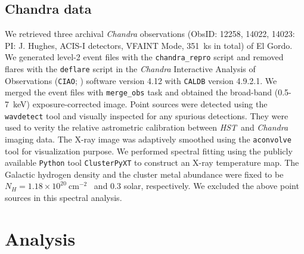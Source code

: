 \documentclass[twocolumn]{aastex631}
\newcommand{\elgordo}{El Gordo}
\newcommand{\HST}{{\it HST}}
\begin{document}
\subsection{Chandra data} \label{Chandra_observations}
We retrieved three archival \emph{Chandra} observations (ObsID: 12258, 14022, 14023: PI: J. Hughes, ACIS-I detectors, VFAINT Mode, 351~ks in total) of \elgordo. 
We generated level-2 event files with the \texttt{chandra\_repro} script and removed flares with the \texttt{deflare} script in the \emph{Chandra} Interactive Analysis of Observations (\texttt{CIAO}; \citealt{CIAO}) software version 4.12 with \texttt{CALDB} version 4.9.2.1. 
We merged the event files with \texttt{merge\_obs} task and obtained the broad-band (0.5-7~keV) exposure-corrected image. 
Point sources were detected using the \texttt{wavdetect} tool and visually inspected for any spurious detections. They were used to verity the relative astrometric calibration between \HST~and \emph{Chandra} imaging data. 
The X-ray image was adaptively smoothed using the \texttt{aconvolve} tool for visualization purpose. 
We performed spectral fitting using the publicly available \texttt{Python} tool \texttt{ClusterPyXT} \citep{Alden2019} to construct an X-ray temperature map. 
The Galactic hydrogen density and the cluster metal abundance were fixed to be $N_H=1.18\times10^{20}~\mbox{cm}^{-2}$~\citep{HI4PI2016} and 0.3 solar, respectively. 
We excluded the above point sources in this spectral analysis. 




\section{Analysis} \label{section_analysis}
\end{document}
